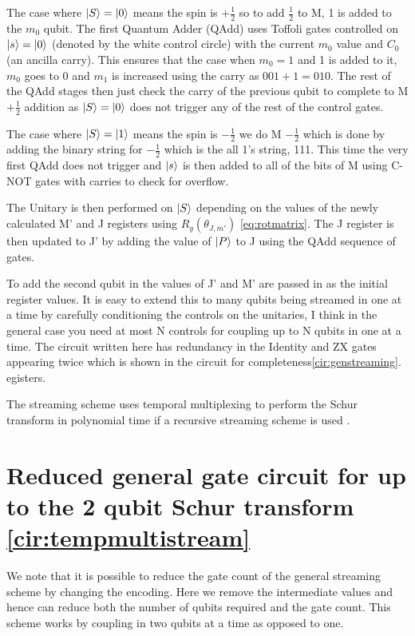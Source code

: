 \documentclass[12pt]{article}
\begin{document}
The case where $\left\vert{S}\right\rangle = \left\vert{0}\right\rangle$ means the spin is $+\frac{1}{2}$ so to add $\frac{1}{2}$ to M, 1 is added to the $m_0$ qubit. The first Quantum Adder (QAdd) uses Toffoli gates controlled on $\left\vert{s}\right\rangle=\left\vert{0}\right\rangle$ (denoted by the white control circle) with the current $m_0$ value and $C_0$ (an ancilla carry). This ensures that the case when $m_0 = 1$ and 1 is added to it, $m_0$ goes to 0 and $m_1$ is increased using the carry as $001+1=010$. The rest of the QAdd stages then just check the carry of the previous qubit to complete to M $+ \frac{1}{2}$ addition as $\left\vert{S}\right\rangle = \left\vert{0}\right\rangle$ does not trigger any of the rest of the control gates.

The case where $\left\vert{S}\right\rangle = \left\vert{1}\right\rangle$ means the spin is $-\frac{1}{2}$ we do M $-\frac{1}{2}$ which is done by adding the binary string for $-\frac{1}{2}$ which is the all 1's string, 111. This time the very first QAdd does not trigger and $\left\vert{s}\right\rangle$ is then added to all of the bits of M using C-NOT gates with carries to check for overflow. 

The Unitary is then performed on $\left\vert{S}\right\rangle$ depending on the values of the newly calculated M' and J registers using $R_y(\theta_{J,m'})$ \autoref{eq:rotmatrix}. The J register is then updated to J' by adding the value of $\left\vert{P}\right\rangle$ to J using the QAdd sequence of gates.

To add the second qubit in the values of J' and M' are passed in as the initial register values. It is easy to extend this to many qubits being streamed in one at a time by carefully conditioning the controls on the unitaries, I think in the general case you need at most N controls for coupling up to N qubits in one at a time. The circuit written here has redundancy in the Identity and ZX gates appearing twice which is shown in the circuit for completeness\autoref{cir:genstreaming}. 
egisters.

The streaming scheme uses temporal multiplexing to perform the Schur transform in polynomial time if a recursive streaming scheme is used \cite{bacon2007quantum}.


\section{Reduced general gate circuit for up to the 2 qubit Schur transform \autoref{cir:tempmultistream}}

We note that it is possible to reduce the gate count of the general streaming scheme by changing the encoding. Here we remove the intermediate values and hence can reduce both the number of qubits required and the gate count. This scheme works by coupling in two qubits at a time as opposed to one.
\end{document}
